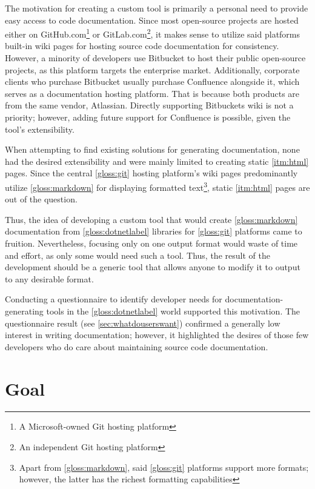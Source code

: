 The motivation for creating a custom tool is primarily a personal need to provide easy access to code documentation. Since most open-source projects are hosted either on GitHub.com\footnote{A Microsoft-owned Git hosting platform} or GitLab.com\footnote{An independent Git hosting platform}, it makes sense to utilize said platforms built-in wiki pages for hosting source code documentation for consistency. However, a minority of developers use Bitbucket to host their public open-source projects, as this platform targets the enterprise market. Additionally, corporate clients who purchase Bitbucket usually purchase Confluence alongside it, which serves as a documentation hosting platform. That is because both products are from the same vendor, Atlassian. Directly supporting Bitbuckets wiki is not a priority; however, adding future support for Confluence is possible, given the tool's extensibility.

When attempting to find existing solutions for generating documentation, none had the desired extensibility and were mainly limited to creating static \ref{itm:html} pages.
Since the central \ref{gloss:git} hosting platform's wiki pages predominantly utilize \ref{gloss:markdown} for displaying formatted text\footnote{Apart from \ref{gloss:markdown}, said \ref{gloss:git} platforms support more formats; however, the latter has the richest formatting capabilities}, static \ref{itm:html} pages are out of the question.

Thus, the idea of developing a custom tool that would create \ref{gloss:markdown} documentation from \ref{gloss:dotnetlabel} libraries for \ref{gloss:git} platforms came to fruition. Nevertheless, focusing only on one output format would waste of time and effort, as only some would need such a tool. Thus, the result of the development should be a generic tool that allows anyone to modify it to output to any desirable format.

Conducting a questionnaire to identify developer needs for documentation-generating tools in the \ref{gloss:dotnetlabel} world supported this motivation. The questionnaire result (see \ref{sec:whatdouserswant}) confirmed a generally low interest in writing documentation; however, it highlighted the desires of those few developers who do care about maintaining source code documentation.

\section*{Goal}

